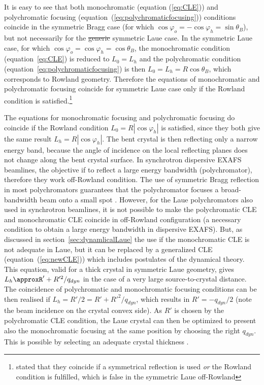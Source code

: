 \documentclass[preprint]{iucr}              %
\newcommand{\inblue}[1]{{\color{blue}#1}}
\newcommand{\inred}[1]{{\color{red}#1}}
\begin{document}
It is easy to see that both monochromatic (equation (\ref{eq:CLE})) and polychromatic focusing (equation~(\ref{eq:polychromaticfocusing})) conditions coincide in the symmetric Bragg case (for which $\cos\varphi_o=-\cos\varphi_h=\sin\theta_B$), but not necessarily for the \inred{\sout{generic} symmetric} Laue case. In the symmetric Laue case, for which $\cos\varphi_o=\cos\varphi_h=\cos\theta_B$, the monochromatic condition (equation~\ref{eq:CLE}) is reduced to $L_0=L_h$ and the polychromatic condition (equation~\ref{eq:polychromaticfocusing}) is then $L_0=L_h=R\cos\theta_B$, which corresponds to Rowland geometry. Therefore the equations of monochromatic and polychromatic focusing coincide for symmetric Laue case only if the Rowland condition is satisfied.\footnote{\cite{CK} stated that they coincide if a symmetrical reflection is used {\it or} the Rowland condition is fulfilled, which is false in the symmetric Laue off-Rowland}

The equations for monochromatic focusing and polychromatic focusing do coincide if the Rowland condition $L_0=R|\cos\varphi_h|$ is satisfied, since they both give the same result $L_h=R|\cos\varphi_h|$. The bent crystal is then reflecting only a narrow energy band, because the angle of incidence on the local reflecting planes does not change along the bent crystal surface.
\inblue{In synchrotron dispersive EXAFS beamlines, the objective if to reflect a large energy bandwidth (polychromator), therefore they work off-Rowland condition. The use of symmetric Bragg reflection in most polychromators guarantees that the polychromator focuses a broad-bandwidth beam onto a small spot \cite{Tolentino:ms0206}. However, for the Laue polychromators also used in synchrotron beamlines, it is not possible to make the polychromatic CLE and monochromatic CLE coincide in off-Rowland configuration (a necessary condition to obtain a large energy bandwidth in dispersive EXAFS). But, as discussed in section~\ref{sec:dynamlicalLaue} the use if the monochromatic CLE is not adequate in Laue, but it can be replaced by a generalized CLE (equation~(\ref{eq:newCLE})) which includes postulates of the dynamical theory.  
This equation, valid for a thick crystal in symmetric Laue geometry, gives $L_h\approxR'+R'^2/q_{dyn}$ in the case of a very large source-to-crystal distance. The coincidence of polychromatic and monochromatic focusing conditions can be then realised if $L_h=R'/2=R'+R'^2/q_{dyn}$, which results in $R'=-q_{dyn}/2$ (note the beam incidence on the crystal convex side). As $R'$ is chosen by the polychromatic CLE condition, the Laue crystal can then be optimized to present also the monochromatic focusing at the same position by choosing the right $q_{dyn}$. This is possible by selecting an adequate crystal thickness \cite{Mocella2004} \cite{Mocella2008}. 
}
\end{document}

